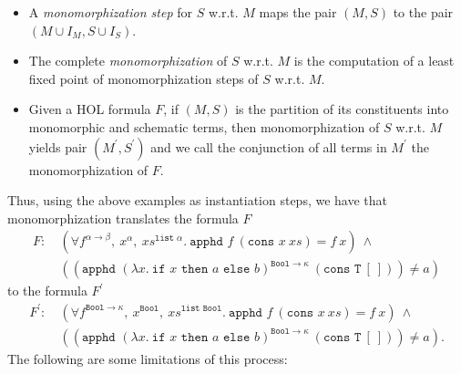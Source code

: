 \documentclass{article}
\begin{document}
	\begin{itemize}
		\item A \textit{monomorphization 
			step} for $S$ w.r.t. $M$ maps 
		the pair $(M,S)$ to the pair 
		$(M \cup I_M, S \cup I_S)$.
		\item The complete 
		\textit{monomorphization} of $S$ 
		w.r.t. $M$ is the computation of 
		a least fixed point of 
		monomorphization steps of $S$ 
		w.r.t. $M$.
		\item Given a HOL formula $F$, 
		if $(M, S)$ is the partition of its 
		constituents into monomorphic and 
		schematic terms, then 
		monomorphization of $S$ 
		w.r.t. $M$ yields pair 
		$(M^{\prime}, S^{\prime})$ and we 
		call the conjunction of all terms in 
		$M^{\prime}$ the monomorphization 
		of $F$.
	\end{itemize}
	Thus, using the above examples as 
	instantiation steps, we have that 
	monomorphization translates the formula $F$
	\begin{align*}
	F:\ &(\forall f^{\alpha \to \beta},\ 
	x^{\alpha},\ xs^{\texttt{list }\alpha}.\ 
	\texttt{apphd }f\ (\texttt{cons }x
	\ xs) = f\ x)\ \land\ \\
	&((\texttt{apphd }(\lambda x.\ 
	\texttt{if }x \texttt{ then }a 
	\texttt{ else } b)^{\texttt{Bool} 
		\to \kappa}\ (\texttt{cons T}\ [\ ])) 
	\neq a)
	\end{align*}
	to the formula $F^{\prime}$
	\begin{align*}
	F^{\prime}:\ &(\forall 
	f^{\texttt{Bool} \to \kappa},\ 
	x^{\texttt{Bool}},\ 
	xs^{\texttt{list Bool}}.\ 
	\texttt{apphd }f\ (\texttt{cons }x
	\ xs) = f\ x) \ \land\ \\
	&((\texttt{apphd } (\lambda x.\ 
	\texttt{if }x \texttt{ then }a 
	\texttt{ else } b)^{\texttt{Bool} 
		\to \kappa}\ (\texttt{cons T}\ 
	[\ ])) \neq a).
	\end{align*}
	\noindent The following are some 
	limitations of this process:
\end{document}
